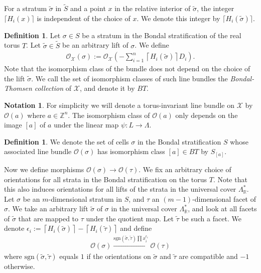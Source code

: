\documentclass[11pt,reqno]{amsart}
\def\R {{\mathbb R}}
\def\Z {{\mathbb Z}}
\theoremstyle{definition}
\newtheorem{definition}[theorem]{Definition}
\newtheorem{notation}[theorem]{Notation}
\numberwithin{equation}{section}
\begin{document}
For a stratum $\widetilde{\sigma}$ in $\widetilde{S}$ and a point $x$ in the relative interior of $\widetilde{\sigma}$, the integer $\lceil H_i(x)\rceil$ is independent of the choice of $x$. We denote this integer by $\lceil H_i(\widetilde{\sigma})\rceil$.

\begin{definition}
    Let $\sigma \in S$ be a stratum in the Bondal stratification of the real torus $T$. Let $\widetilde{\sigma}\in \widetilde{S}$ be an arbitrary lift of $\sigma$. We define
    \begin{align*}
        \mathcal{O}_{\mathcal{X}}(\sigma):=\mathcal{O}_{\mathcal{X}}\left( - \sum_{i=1}^n \left\lceil H_{i}(\widetilde{\sigma})  \right\rceil D_{i} \right).
    \end{align*}
    Note that the isomorphism class of the bundle does not depend on the choice of the lift $\widetilde{\sigma}$. We call the set of isomorphism classes of such line bundles  the \textit{Bondal-Thomsen collection} of $\mathcal{X}$, and denote it by $BT$.
\end{definition}

\begin{notation}
For simplicity we will denote a torus-invariant line bundle on $\mathcal{X}$ by $\mathcal{O}(a)$ where $a\in\Z^n$. The isomorphism class of $\mathcal{O}(a)$ only depends on the image $[a]$ of $a$ under the linear map $\psi: L\rightarrow\Lambda$.
\end{notation}

\begin{definition}
    We denote the set of cells $\sigma$ in the Bondal stratification $S$ whose associated line bundle $\mathcal{O}(\sigma)$ has isomorphism class $[a]\in BT$ by $S_{[a]}$.
\end{definition}

Now we define morphisms $\mathcal{O}(\sigma)\rightarrow\mathcal{O}(\tau)$. We fix an arbitrary choice of orientations for all strata in the Bondal stratification on the torus $T$. Note that this also induces orientations for all lifts of the strata in the universal cover $\Lambda^*_{\R}$. Let $\sigma$ be an $m$-dimensional stratum in $S$, and $\tau$ an $(m-1)$-dimensional facet of $\sigma$. We take an arbitrary lift $\widetilde{\sigma}$ of $\sigma$ in the universal cover $\Lambda^*_{\R}$, and look at all facets of $\widetilde{\sigma}$ that are mapped to $\tau$ under the quotient map. Let $\widetilde{\tau}$ be such a facet. We denote $\epsilon_{i}:=\left\lceil H_{i}(\widetilde{\sigma})  \right\rceil - \left\lceil H_{i}(\widetilde{\tau})  \right\rceil $ and define
\begin{align*}
    \mathcal{O}(\sigma)\xrightarrow{\mathrm{sgn}(\widetilde{\sigma},\widetilde{\tau})\prod x_{i}^{\epsilon_{i}}}\mathcal{O}(\tau)
\end{align*}
where $\mathrm{sgn}(\widetilde{\sigma},\widetilde{\tau})$ equals $1$ if the orientations on $\widetilde{\sigma}$ and $\widetilde{\tau}$ are compatible and $-1$ otherwise.
\end{document}
